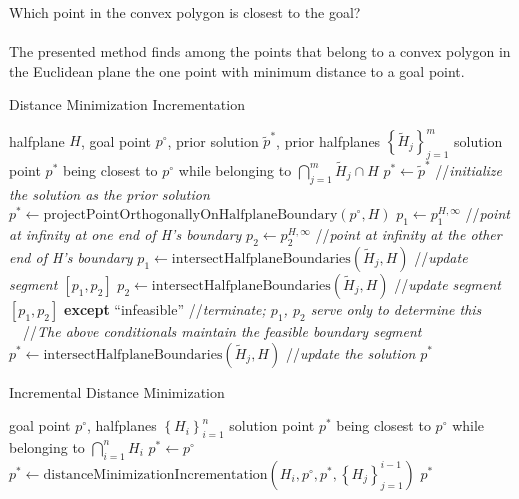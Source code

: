 \documentclass{article}
\begin{document}
{\centering \large Which point in the convex polygon is closest to the goal?\\}
~\\
The presented method finds among the points that belong to a convex polygon in the Euclidean plane the one point with minimum distance to a goal point.
\begin{algorithm}
\caption{Distance Minimization Incrementation}
\label{alg:incrementation}
\begin{algorithmic}
\REQUIRE 	halfplane $ H $, goal point $ p^\circ $, prior solution $\tilde p^* $, prior halfplanes $ \left\{\tilde H_j\right\}_{j=1}^{m}$
\ENSURE 	solution point $ p^* $ being closest to $ p^\circ $ while belonging to $ \bigcap\limits_{j=1}^{m} \tilde H_j \cap H  $
\STATE $ p^* \leftarrow \tilde p^* $ //\textit{initialize the solution as the prior solution}
	\STATE $ p^* \leftarrow \text{projectPointOrthogonallyOnHalfplaneBoundary}(p^\circ, H) $
	\STATE $ p_1 \leftarrow p_1^{H, \infty} $ //\textit{point at infinity at one end of H's boundary}
	\STATE $ p_2 \leftarrow p_2^{H, \infty} $ //\textit{point at infinity at the other end of H's boundary}
			\STATE $  p_1 \leftarrow \text{intersectHalfplaneBoundaries}(\tilde H_j, H) $ //\textit{update segment $ [p_1, p_2] $}
			\STATE $ p_2 \leftarrow \text{intersectHalfplaneBoundaries}(\tilde H_j, H) $ //\textit{update segment $ [p_1, p_2] $}
			\STATE \textbf{except} ``infeasible'' //\textit{terminate; $ p_1 $, $ p_2 $ serve only to determine this}
		\ENDIF ~~//\textit{The above conditionals maintain the feasible boundary segment}
			\STATE $ p^* \leftarrow \text{intersectHalfplaneBoundaries}(\tilde H_j, H) $ //\textit{update the solution}
		\ENDIF
	\ENDFOR
\ENDIF
\RETURN $ p^* $
\end{algorithmic}
\end{algorithm}
\begin{algorithm}[h!]
	\caption{Incremental Distance Minimization}
	\label{alg:incrementalMin}
	\begin{algorithmic}
		\REQUIRE 	goal point $ p^\circ $, halfplanes $ \left\{ H_i\right\}_{i=1}^{n}$
		\ENSURE 	solution point $ p^* $ being closest to $ p^\circ $ while belonging to $ \bigcap\limits_{i=1}^{n}  H_i  $
		\STATE $ p^* \leftarrow p^\circ $
			\STATE $ p^* \leftarrow \text{distanceMinimizationIncrementation}\left(H_i, p^\circ, p^*, \left\{ H_j\right\}_{j=1}^{i-1}\right) $
		\ENDFOR
		\RETURN $ p^* $
	\end{algorithmic}
\end{algorithm}
\end{document}
